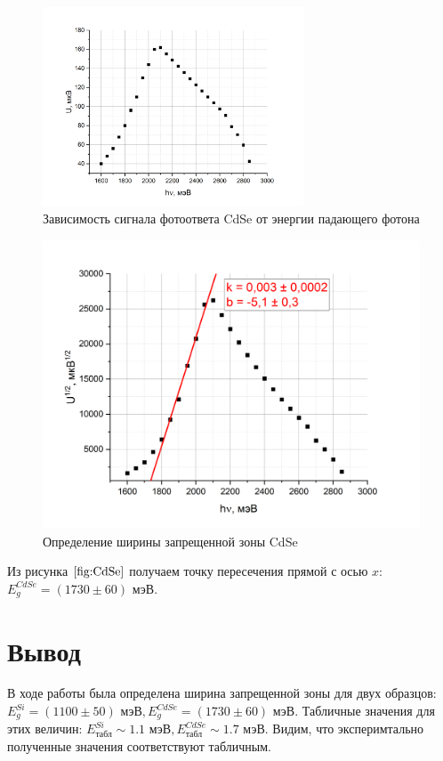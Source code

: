 \documentclass[a4paper,12pt]{article} %
\begin{document}
\begin{figure}[h!]
    \centering
    \includegraphics[width = 0.69\textwidth]{CdSe_raw.png}
    \caption{Зависимость сигнала фотоответа CdSe от энергии падающего фотона}
    \label{fig:CdSe_raw_data}
\end{figure}

\begin{figure}[h!]
    \centering
    \includegraphics[width = 0.69 \textwidth]{CdSe.png}
    \caption{Определение ширины запрещенной зоны CdSe}
    \label{fig:CdSe}
\end{figure}

\newpage

Из рисунка $\ref{fig:CdSe}$ получаем точку пересечения прямой с осью $x$: $E_{g}^{CdSe} = (1730 \pm 60) \text{ мэВ}.$




\section{Вывод}

В ходе работы была определена ширина запрещенной зоны для двух образцов: $E_{g}^{Si} = (1100 \pm 50) \text{ мэВ}, E_{g}^{CdSe} = (1730 \pm 60) \text{ мэВ}.$ Табличные значения для этих величин: $E_{\text{табл}}^{Si} \sim 1.1 \text{ мэВ}, E_{\text{табл}}^{CdSe} \sim 1.7 \text{ мэВ}.$ Видим, что эксперимтально полученные значения соответствуют табличным.
\end{document}
